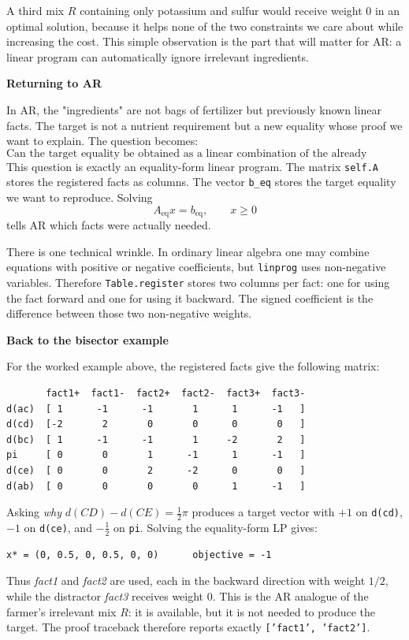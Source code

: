 \documentclass[reqno]{amsart}
\newcommand{\examplepart}[1]{%
    \par\medskip
    \noindent\textbf{\color{agblue}#1}\par\smallskip\noindent
}
\DeclareMathOperator{\1}{\textbf{1}}
\begin{document}
A third mix \(R\) containing only potassium and sulfur would receive weight
\(0\) in an optimal solution, because it helps none of the two constraints
we care about while increasing the cost. This simple observation is the
part that will matter for AR: a linear program can automatically ignore
irrelevant ingredients.

\examplepart{Returning to AR}
In AR, the "ingredients" are not bags of fertilizer but previously known
linear facts. The target is not a nutrient requirement but a new equality
whose proof we want to explain. The question becomes:
\[
\text{Can the target equality be obtained as a linear combination of the
already registered facts?}
\]
This question is exactly an equality-form linear program. The matrix
\verb|self.A| stores the registered facts as columns. The vector
\verb|b_eq| stores the target equality we want to reproduce. Solving
\[
A_{\mathrm{eq}}x=b_{\mathrm{eq}}, \qquad x\geq0
\]
tells AR which facts were actually needed.

There is one technical wrinkle. In ordinary linear algebra one may combine
equations with positive or negative coefficients, but \verb|linprog| uses
non-negative variables. Therefore \verb|Table.register| stores two columns
per fact: one for using the fact forward and one for using it backward. The
signed coefficient is the difference between those two non-negative
weights.

\examplepart{Back to the bisector example}
For the worked example above, the registered facts give the following matrix:
\begin{lstlisting}
       fact1+  fact1-  fact2+  fact2-  fact3+  fact3-
d(ac)  [ 1      -1      -1       1      1      -1   ]
d(cd)  [-2       2       0       0      0       0   ]
d(bc)  [ 1      -1      -1       1     -2       2   ]
pi     [ 0       0       1      -1      1      -1   ]
d(ce)  [ 0       0       2      -2      0       0   ]
d(ab)  [ 0       0       0       0      1      -1   ]
\end{lstlisting}
Asking \emph{why} \(d(CD)-d(CE)=\tfrac12\pi\) produces a target vector with
\(+1\) on \verb|d(cd)|, \(-1\) on \verb|d(ce)|, and \(-\tfrac12\) on
\verb|pi|. Solving the equality-form LP gives:
\begin{lstlisting}
x* = (0, 0.5, 0, 0.5, 0, 0)      objective = -1
\end{lstlisting}
Thus \emph{fact1} and \emph{fact2} are used, each in the backward direction
with weight \(1/2\), while the distractor \emph{fact3} receives weight
\(0\). This is the AR analogue of the farmer's irrelevant mix \(R\): it is
available, but it is not needed to produce the target. The proof traceback
therefore reports exactly \texttt{['fact1', 'fact2']}.
\end{document}
